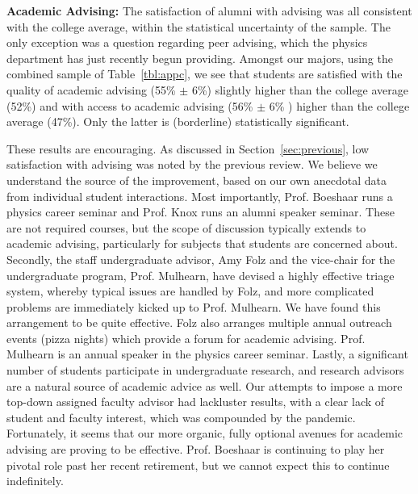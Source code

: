 \documentclass[12pt]{article}
\begin{document}
\noindent
{\bf Academic Advising:} The satisfaction of alumni with advising was
all consistent with the college average, within the statistical
uncertainty of the sample.  The only exception was a question
regarding peer advising, which the physics department has just
recently begun providing.  Amongst our majors, using the combined
sample of Table~\ref{tbl:appc}, we see that students are satisfied
with the quality of academic advising (55\% $\pm$ 6\%) slightly higher
than the college average (52\%) and with access to academic advising
(56\% $\pm$ 6\% ) higher than the college average (47\%).  Only the
latter is (borderline) statistically significant.

These results are encouraging.  As discussed in
Section~\ref{sec:previous}, low satisfaction with advising was noted
by the previous review.  We believe we understand the source of the
improvement, based on our own anecdotal data from individual student
interactions.  Most importantly, Prof. Boeshaar runs a physics career
seminar and Prof. Knox runs an alumni speaker seminar.  These are not
required courses, but the scope of discussion typically extends to
academic advising, particularly for subjects that students are
concerned about.  Secondly, the staff undergraduate advisor, Amy Folz
and the vice-chair for the undergraduate program, Prof. Mulhearn, have
devised a highly effective triage system, whereby typical issues are
handled by Folz, and more complicated problems are immediately kicked
up to Prof. Mulhearn.  We have found this arrangement to be quite
effective.  Folz also arranges multiple annual outreach events (pizza
nights) which provide a forum for academic advising.  Prof. Mulhearn
is an annual speaker in the physics career seminar.  Lastly, a
significant number of students participate in undergraduate research,
and research advisors are a natural source of academic advice as well.
Our attempts to impose a more top-down assigned faculty advisor had
lackluster results, with a clear lack of student and faculty interest,
which was compounded by the pandemic.  Fortunately, it seems that our
more organic, fully optional avenues for academic advising are proving
to be effective.  Prof. Boeshaar is continuing to play her pivotal role past
her recent retirement, but we cannot expect this to continue
indefinitely.\\[3pt]
\end{document}
